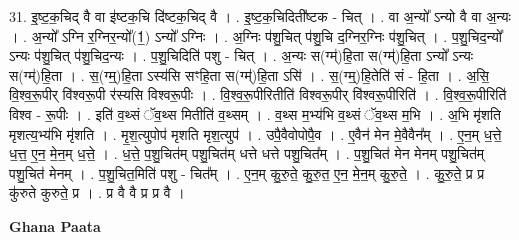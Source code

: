 \documentclass[17pt]{extarticle}
\begin{document}
31. इ॒ष्ट॒क॒चिद् वै वा इ॑ष्टक॒चि दि॑ष्टक॒चिद् वै । . इ॒ष्ट॒क॒चिदिती᳚ष्टक - चित् । . वा अ॒न्यो᳚ ऽन्यो वै वा अ॒न्यः । . अ॒न्यो᳚ ऽग्नि र॒ग्निर॒न्यो᳚(1॒) ऽन्यो᳚ ऽग्निः । . अ॒ग्निः प॑शु॒चित् प॑शु॒चि द॒ग्निर॒ग्निः प॑शु॒चित् । . प॒शु॒चिद॒न्यो᳚ ऽन्यः प॑शु॒चित् प॑शु॒चिद॒न्यः । . प॒शु॒चिदिति॑ पशु - चित् । . अ॒न्यः स(ग्म्॑)हि॒ता स(ग्म्॑)हि॒ता ऽन्यो᳚ ऽन्यः स(ग्म्॑)हि॒ता । . स॒(ग्म्॒)हि॒ता ऽस्य॑सि सꣳहि॒ता स(ग्म्॑)हि॒ता ऽसि॑ । . स॒(ग्म्॒)हि॒तेति॑ सं - हि॒ता । . अ॒सि॒ वि॒श्व॒रू॒पीर् वि॑श्वरू॒पी र॑स्यसि विश्वरू॒पीः । . वि॒श्व॒रू॒पीरितीति॑ विश्वरू॒पीर् वि॑श्वरू॒पीरिति॑ । . वि॒श्व॒रू॒पीरिति॑ विश्व - रू॒पीः । . इति॑ व॒थ्सं ॅव॒थ्स मितीति॑ व॒थ्सम् । . व॒थ्स म॒भ्य॑भि व॒थ्सं ॅव॒थ्स म॒भि । . अ॒भि मृ॑शति मृशत्य॒भ्य॑भि मृ॑शति । . मृ॒श॒त्युपोप॑ मृशति मृश॒त्युप॑ । . उपै॒वैवोपोपै॒व । . ए॒वैन॑ मेन मे॒वैवैन᳚म् । . ए॒न॒म् ध॒त्ते॒ ध॒त्त॒ ए॒न॒ मे॒न॒म् ध॒त्ते॒ । . ध॒त्ते॒ प॒शु॒चित॑म् पशु॒चित॑म् धत्ते धत्ते पशु॒चित᳚म् । . प॒शु॒चित॑ मेन मेनम् पशु॒चित॑म् पशु॒चित॑ मेनम् । . प॒शु॒चित॒मिति॑ पशु - चित᳚म् । . ए॒न॒म् कु॒रु॒ते॒ कु॒रु॒त॒ ए॒न॒ मे॒न॒म् कु॒रु॒ते॒ । . कु॒रु॒ते॒ प्र प्र कु॑रुते कुरुते॒ प्र । . प्र वै वै प्र प्र वै । \newline

\textbf{Ghana Paata } \newline
\end{document}
